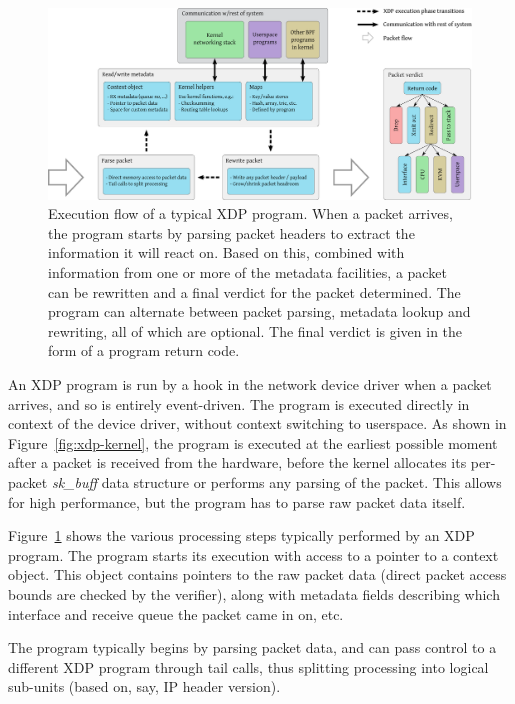 \documentclass[10pt,sigconf]{acmart}
\begin{document}
\begin{figure}[t]
\centering
\includegraphics[width=\linewidth]{figures/xdp-execution-diagram.pdf}
\caption{\label{fig:xdp-execution} Execution flow of a typical XDP program. When
  a packet arrives, the program starts by parsing packet headers to extract the
  information it will react on. Based on this, combined with information from
  one or more of the metadata facilities, a packet can be rewritten and a final
  verdict for the packet determined. The program can alternate between packet
  parsing, metadata lookup and rewriting, all of which are optional. The final
  verdict is given in the form of a program return code.}
\end{figure}


An XDP program is run by a hook in the network device driver when a packet
arrives, and so is entirely event-driven. The program is executed directly in
context of the device driver, without context switching to userspace. As shown
in Figure~\ref{fig:xdp-kernel}, the program is executed at the earliest possible
moment after a packet is received from the hardware, before the kernel allocates
its per-packet \emph{sk\_buff} data structure or performs any parsing of the
packet. This allows for high performance, but the program has to parse raw
packet data itself.

Figure~\ref{fig:xdp-execution} shows the various processing steps typically
performed by an XDP program. The program starts its execution with access to a
pointer to a context object. This object contains pointers to the raw packet
data (direct packet access bounds are checked by the verifier), along with
metadata fields describing which interface and receive queue the packet came in
on, etc.

The program typically begins by parsing packet data, and can pass control to a
different XDP program through tail calls, thus splitting processing into
logical sub-units (based on, say, IP header version).
\end{document}
